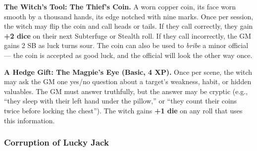 \textbf{The Witch's Tool: The Thief's Coin.} A worn copper coin, its face worn smooth by a thousand hands, its edge notched with nine marks. Once per session, the witch may flip the coin and call heads or tails. If they call correctly, they gain \textbf{+2 dice} on their next Subterfuge or Stealth roll. If they call incorrectly, the GM gains 2 SB as luck turns sour. The coin can also be used to \textit{bribe} a minor official --- the coin is accepted as good luck, and the official will look the other way once.

\textbf{A Hedge Gift: The Magpie's Eye (Basic, 4 XP).} Once per scene, the witch may ask the GM one yes/no question about a target's weakness, habit, or hidden valuables. The GM must answer truthfully, but the answer may be cryptic (e.g., ``they sleep with their left hand under the pillow,'' or ``they count their coins twice before locking the chest''). The witch gains \textbf{+1 die} on any roll that uses this information.

\subsubsection*{Corruption of Lucky Jack}

